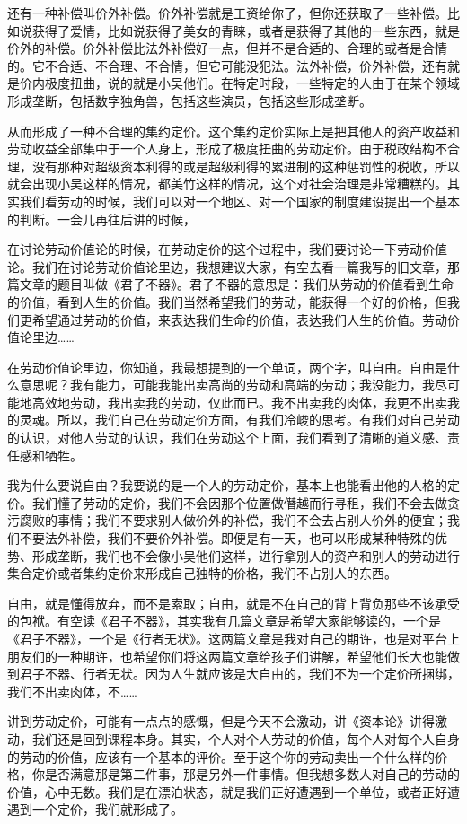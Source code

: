 \documentclass[UTF8, 12pt, a4paper]{ctexrep}
\begin{document}
还有一种补偿叫价外补偿。价外补偿就是工资给你了，但你还获取了一些补偿。比如说获得了爱情，比如说获得了美女的青睐，或者是获得了其他的一些东西，就是价外的补偿。价外补偿比法外补偿好一点，但并不是合适的、合理的或者是合情的。它不合适、不合理、不合情，但它可能没犯法。法外补偿，价外补偿，还有就是价内极度扭曲，说的就是小吴他们。在特定时段，一些特定的人由于在某个领域形成垄断，包括数字独角兽，包括这些演员，包括这些形成垄断。

从而形成了一种不合理的集约定价。这个集约定价实际上是把其他人的资产收益和劳动收益全部集中于一个人身上，形成了极度扭曲的劳动定价。由于税政结构不合理，没有那种对超级资本利得的或是超级利得的累进制的这种惩罚性的税收，所以就会出现小吴这样的情况，都美竹这样的情况，这个对社会治理是非常糟糕的。其实我们看劳动的时候，我们可以对一个地区、对一个国家的制度建设提出一个基本的判断。一会儿再往后讲的时候，

在讨论劳动价值论的时候，在劳动定价的这个过程中，我们要讨论一下劳动价值论。我们在讨论劳动价值论里边，我想建议大家，有空去看一篇我写的旧文章，那篇文章的题目叫做《君子不器》。君子不器的意思是：我们从劳动的价值看到生命的价值，看到人生的价值。我们当然希望我们的劳动，能获得一个好的价格，但我们更希望通过劳动的价值，来表达我们生命的价值，表达我们人生的价值。劳动价值论里边……

在劳动价值论里边，你知道，我最想提到的一个单词，两个字，叫自由。自由是什么意思呢？我有能力，可能我能出卖高尚的劳动和高端的劳动；我没能力，我尽可能地高效地劳动，我出卖我的劳动，仅此而已。我不出卖我的肉体，我更不出卖我的灵魂。所以，我们自己在劳动定价方面，有我们冷峻的思考。有我们对自己劳动的认识，对他人劳动的认识，我们在劳动这个上面，我们看到了清晰的道义感、责任感和牺牲。

我为什么要说自由？我要说的是一个人的劳动定价，基本上也能看出他的人格的定价。我们懂了劳动的定价，我们不会因那个位置做僭越而行寻租，我们不会去做贪污腐败的事情；我们不要求别人做价外的补偿，我们不会去占别人价外的便宜；我们不要法外补偿，我们不要价外补偿。即便是有一天，也可以形成某种特殊的优势、形成垄断，我们也不会像小吴他们这样，进行拿别人的资产和别人的劳动进行集合定价或者集约定价来形成自己独特的价格，我们不占别人的东西。

自由，就是懂得放弃，而不是索取；自由，就是不在自己的背上背负那些不该承受的包袱。有空读《君子不器》，其实我有几篇文章是希望大家能够读的，一个是《君子不器》，一个是《行者无状》。这两篇文章是我对自己的期许，也是对平台上朋友们的一种期许，也希望你们将这两篇文章给孩子们讲解，希望他们长大也能做到君子不器、行者无状。因为人生就应该是大自由的，我们不为一个定价所捆绑，我们不出卖肉体，不……

讲到劳动定价，可能有一点点的感慨，但是今天不会激动，讲《资本论》讲得激动，我们还是回到课程本身。其实，个人对个人劳动的价值，每个人对每个人自身的劳动的价值，应该有一个基本的评价。至于这个你的劳动卖出一个什么样的价格，你是否满意那是第二件事，那是另外一件事情。但我想多数人对自己的劳动的价值，心中无数。我们是在漂泊状态，就是我们正好遭遇到一个单位，或者正好遭遇到一个定价，我们就形成了。
\end{document}
